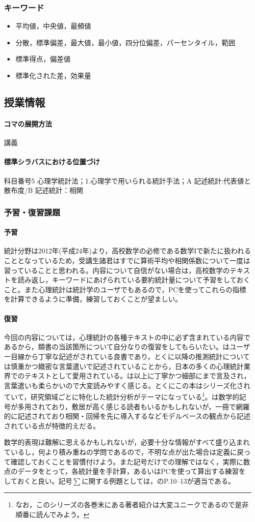 \subsubsection{キーワード}
\begin{itemize}
	\item 平均値，中央値，最頻値
	\item 分散，標準偏差，最大値，最小値，四分位偏差，パーセンタイル，範囲
	\item 標準得点，偏差値
	\item 標準化された差，効果量
\end{itemize}
\subsection{授業情報}
\paragraph{コマの展開方法}
講義
\paragraph{標準シラバスにおける位置づけ}
科目番号5 心理学統計法；1.心理学で用いられる統計手法；A 記述統計:代表値と散布度/B 記述統計：相関
\subsubsection{予習・復習課題}
\paragraph{予習}
統計分野は2012年(平成24年)より，高校数学の必修である数学Iで新たに扱われることとなっているため，受講生諸君はすでに算術平均や相関係数について一度は習っていることと思われる。内容について自信がない場合は，高校数学のテキストを読み返し，キーワードにあげられている要約統計量について予習をしておくこと。また心理統計は統計学のユーザでもあるので，PCを使ってこれらの指標を計算できるように準備，練習しておくことが望ましい。
\paragraph{復習}
今回の内容については，心理統計の各種テキストの中に必ず含まれている内容であるから，類書の当該箇所について自分なりの復習をしてもらいたい。\textcite{Yamada2004}はユーザー目線から丁寧な記述がされている良書であり，とくに以降の推測統計については慎重かつ緻密な言葉遣いで記述されていることから，日本の多くの心理統計業界でのテキストとして愛用されている。\textcite{Kawabata201408}は\textcite{Yamada2004}以上に丁寧かつ細部にまで言及され，言葉遣いも柔らかいので大変読みやすく感じる。とくにこの本はシリーズ化されていて，研究領域ごとに特化した統計分析がテーマになっている\footnote{なお，このシリーズの各巻末にある著者紹介は大変ユニークであるので是非順番に読んでみよう。}。\textcite{Yamauchi201001}は数学的記号が多用されており，敷居が高く感じる読者もいるかもしれないが，一冊で網羅的に記述されており相関・回帰を先に導入するなどモデルベースの観点から記述されている点が特徴的えだる。

数学的表現は難解に思えるかもしれないが，必要十分な情報がすべて盛り込まれているし，何より積み重ねの学問であるので，不明な点が出た場合は定義に戻って確認しておくことを習慣付けよう。また記号だけでの理解ではなく，実際に数点のデータをとって，各統計量を手計算，あるいはPCを使って算出する練習をしておくと良い。記号$\sum$に関する例題としては，\textcite{Yamauchi201001}のP.10--13が適当である。
